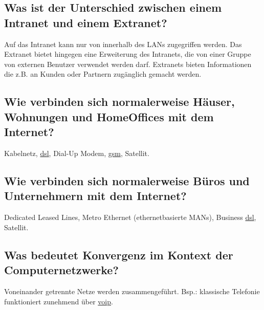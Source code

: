\subsection*{Was ist der Unterschied zwischen einem Intranet und einem Extranet?}
Auf das Intranet kann nur von innerhalb des LANs zugegriffen werden. Das Extranet bietet hingegen eine Erweiterung des Intranets, die von einer Gruppe von externen Benutzer verwendet werden darf. Extranets bieten Informationen die z.B. an Kunden oder Partnern zugänglich gemacht werden.

\subsection*{Wie verbinden sich normalerweise Häuser, Wohnungen und HomeOffices mit dem Internet?}
Kabelnetz, \underline{\acrshort{dsl}}, Dial-Up Modem, \underline{\acrshort{gsm}}, Satellit.

\subsection*{Wie verbinden sich normalerweise Büros und Unternehmern mit dem Internet?}
Dedicated Leased Lines, Metro Ethernet (ethernetbasierte MANs), Business \underline{\acrshort{dsl}}, Satellit.

\subsection*{Was bedeutet Konvergenz im Kontext der Computernetzwerke?}
Voneinander getrennte Netze werden zusammengeführt. Bsp.: klassische Telefonie funktioniert zunehmend über \underline{\acrshort{voip}}.


